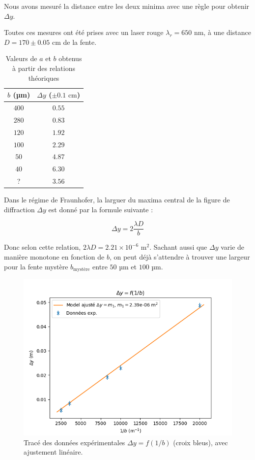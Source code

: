 \documentclass{article}
\begin{document}
Nous avons mesuré la distance entre les deux minima avec une règle pour obtenir $\Delta y$. 

Toutes ces mesures ont été prises avec un laser rouge $\lambda_r = 650 \textrm{ nm}$, 
à une distance $D = 170 \pm 0.05 \textrm{ cm}$ de la fente. 


\begin{table}[H]
\begin{center}
    \begin{tabular}{|c|c|}
    \hline
    $b$ (µm) & $\Delta y$ ($\pm 0.1 \textrm{ cm}$) \\
    \hline
    $400$ & $0.55$ \\
    $280$ & $0.83$ \\
    $120$ & $1.92$ \\
    $100$ & $2.29$ \\
    $50$ & $4.87$ \\
    $40$ & $6.30$ \\
    ? & $3.56$ \\
    \hline
\end{tabular}
\end{center}
\caption{Valeurs de $a$ et $b$ obtenus à partir des relations théoriques}
\end{table}

Dans le régime de Fraunhofer, la larguer du maxima central de la figure de diffraction $\Delta y$ est donné par la formule suivante :

\begin{equation}
    \Delta y = 2 \frac{\lambda D}{b}
\end{equation}

Donc selon cette relation, $2\lambda D = 2.21 \times 10^{-6} \textrm{ m}^2$. Sachant aussi que $\Delta y$ varie de manière monotone en fonction de $b$, on peut déjà s'attendre
à trouver une largeur pour la fente mystère $b_{\textrm{mystère}}$ entre $50 \textrm{ µm}$ et $100 \textrm{ µm}$.


\begin{figure}[H]
    \centering
    \includegraphics[width=0.6\linewidth]{figs/diff_1.png}
    \caption{Tracé des données expérimentales $\Delta y = f(1/b)$ (croix bleus), avec ajustement linéaire.}
    \label{fig:diff_1}
\end{figure}
\end{document}
